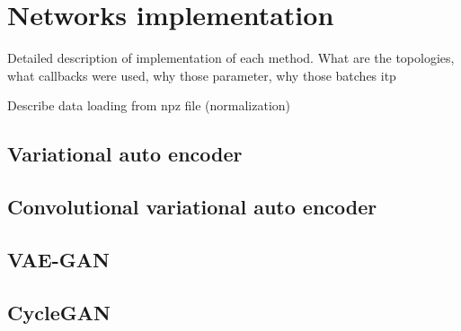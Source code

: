 \chapter{Networks implementation}
Detailed description of implementation of each method. What are the topologies, what callbacks were used, why those parameter, why those batches itp

Describe data loading from npz file (normalization)
\section{Variational auto encoder}
\section{Convolutional variational auto encoder}
\section{VAE-GAN}
\section{CycleGAN}